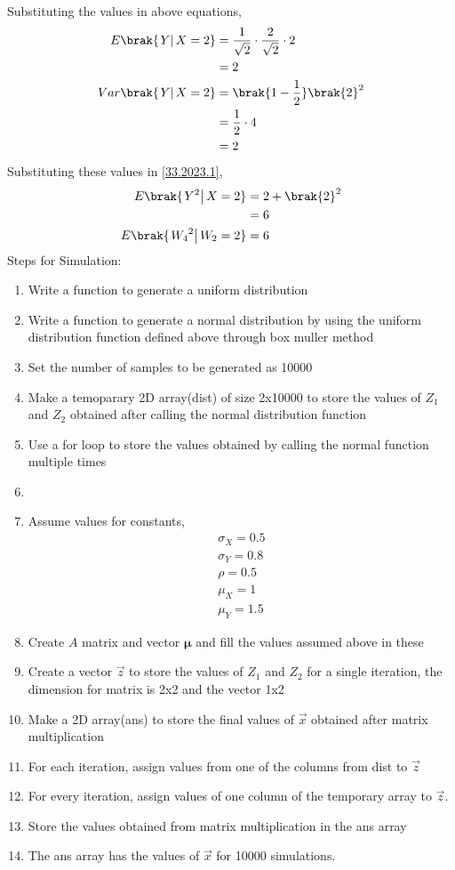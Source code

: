 \documentclass[journal,12pt,twocolumn]{IEEEtran}
\theoremstyle{remark}
\begin{document}
Substituting the values in above equations,
\begin{align}
E\brak{\left.Y\right | X=2} &= \frac{1}{\sqrt{2}}\cdot\frac{2}{\sqrt{2}}\cdot 2\\
			    &= 2\\
Var\brak{\left.Y\right | X=2} &= \brak{1 - \frac{1}{2}}\brak{2}^2\\
			      &= \frac{1}{2}\cdot 4\\
			      &= 2
\end{align}
Substituting these values in \eqref{33.2023.1},
\begin{align}
E\brak{\left.Y^2\right | X=2} &= 2 + \brak{2}^2\\
			      &= 6\\
E\brak{\left.{W_4}^2\right | W_2=2} &= 6
\end{align}
\newline\newline\newline
Steps for Simulation:
\begin{enumerate}
\item Write a function to generate a uniform distribution
\item Write a function to generate a normal distribution by using the uniform distribution function defined above through box muller method
\item Set the number of samples to be generated as 10000
\item Make a temoparary 2D array(dist) of size 2x10000 to store the values of $Z_1$ and $Z_2$ obtained after calling the normal distribution function
\item Use a for loop to store the values obtained by calling the normal function multiple times 
\item 
\item Assume values for constants,
\begin{align}
\sigma_X = 0.5\\
\sigma_Y = 0.8\\
\rho = 0.5\\
\mu_X = 1\\
\mu_Y = 1.5
\end{align}
\item Create $A$ matrix and vector $\bm{\mu}$ and fill the values assumed above in these
\item Create a vector $\vec{z}$ to store the values of $Z_1$ and $Z_2$ for a single iteration, the dimension for matrix is 2x2 and the vector 1x2
\item Make a 2D array(ans) to store the final values of $\vec{x}$ obtained after matrix multiplication
\item For each iteration, assign values from one of the columns from dist to $\vec{z}$ 
\item For every iteration, assign values of one column of the temporary array to $\vec{z}$.
\item Store the values obtained from matrix multiplication in the ans array
\item The ans array has the values of $\vec{x}$ for 10000 simulations.
\end{enumerate}
\end{document}
